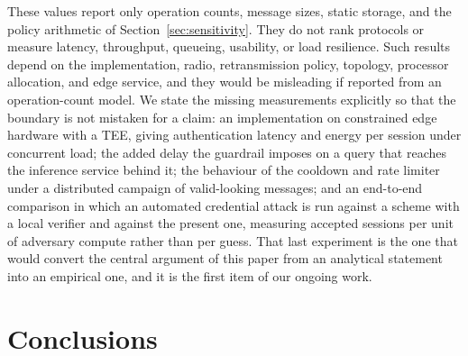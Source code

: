 \documentclass[cmc,article,submit,moreauthors,pdftex]{Definitions/tsp}
\providecommand{\DIFdel}[1]{{\protect\color{red} \scriptsize #1}} %
\providecommand{\DIFdelbegin}{} %
\providecommand{\DIFdelend}{} %
\begin{document}
\DIFdelbegin %

\DIFdel{These values report only operation counts, message sizes, static storage, and the policy arithmetic of Section~\ref{sec:sensitivity}. They do not rank protocols or measure latency, throughput, queueing, usability, or load resilience. Such results depend on the implementation, radio, retransmission policy, topology, processor allocation, and edge service, and they would be misleading if reported from an operation-count model. We state the missing measurements explicitly so that the boundary is not mistaken for a claim: an implementation on constrained edge hardware with a TEE, giving authentication latency and energy per session under concurrent load; the added delay the guardrail imposes on a query that reaches the inference service behind it; the behaviour of the cooldown and rate limiter under a distributed campaign of valid-looking messages; and an end-to-end comparison in which an automated credential attack is run against a scheme with a local verifier and against the present one, measuring accepted sessions per unit of adversary compute rather than per guess. That last experiment is the one that would convert the central argument of this paper from an analytical statement into an empirical one, and it is the first item of our ongoing work.
}%

\DIFdelend %
\section{Conclusions}\label{sec:conclusions}
\end{document}
